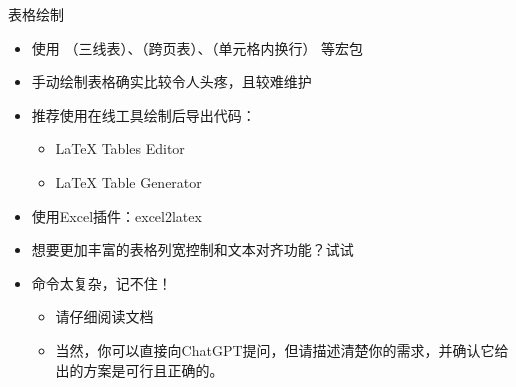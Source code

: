\begin{frame}[fragile]{表格绘制}
    \begin{itemize}
        \item 使用 （三线表）、（跨页表）、（单元格内换行） 等宏包
        \item 手动绘制表格确实比较令人头疼，且较难维护
        \item 推荐使用在线工具绘制后导出代码：
              \begin{itemize}
                  \item \LaTeX{} Tables Editor 
                  \item \LaTeX{} Table Generator 
              \end{itemize}
        \item 使用Excel插件：excel2latex 
        \item 想要更加丰富的表格列宽控制和文本对齐功能？试试
        \item 命令太复杂，记不住！
              \begin{itemize}
                  \item 请仔细阅读文档
                  \item 当然，你可以直接向ChatGPT提问，但请描述清楚你的需求，并确认它给出的方案是可行且正确的。
              \end{itemize}
    \end{itemize}
\end{frame}



